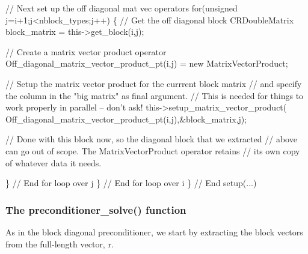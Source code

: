 \begin{DoxyCodeInclude}
    \textcolor{comment}{// Next set up the off diagonal mat vec operators}
    \textcolor{keywordflow}{for}(\textcolor{keywordtype}{unsigned} j=i+1;j<nblock\_types;j++)
     \{
      \textcolor{comment}{// Get the off diagonal block}
      CRDoubleMatrix block\_matrix = this->get\_block(i,j);

      \textcolor{comment}{// Create a matrix vector product operator}
      Off\_diagonal\_matrix\_vector\_product\_pt(i,j) = \textcolor{keyword}{new} MatrixVectorProduct;

      \textcolor{comment}{// Setup the matrix vector product for the currrent block matrix}
      \textcolor{comment}{// and specify the column in the "big matrix" as final argument.}
      \textcolor{comment}{// This is needed for things to work properly in parallel -- don't ask!}
      this->setup\_matrix\_vector\_product(
       Off\_diagonal\_matrix\_vector\_product\_pt(i,j),&block\_matrix,j);

      \textcolor{comment}{// Done with this block now, so the diagonal block that we extracted}
      \textcolor{comment}{// above can go out of scope. The MatrixVectorProduct operator retains}
      \textcolor{comment}{// its own copy of whatever data it needs.}

     \} \textcolor{comment}{// End for loop over j}
   \} \textcolor{comment}{// End for loop over i}
 \} \textcolor{comment}{// End setup(...)}

\end{DoxyCodeInclude}
\hypertarget{index_upper_triangular_solve}{}\subsubsection{The preconditioner\+\_\+solve() function}\label{index_upper_triangular_solve}
As in the block diagonal preconditioner, we start by extracting the block vectors from the full-\/length vector, {\ttfamily r}.


